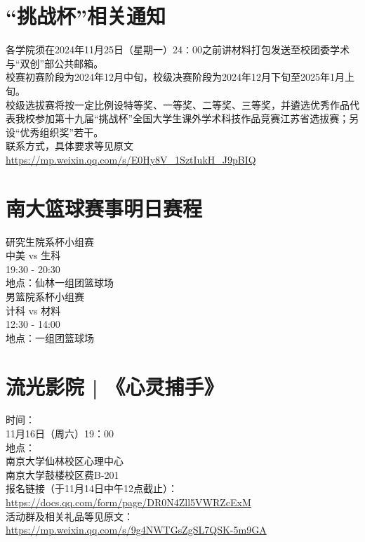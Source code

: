 \documentclass[letterpaper, 12pt]{article}
\begin{document}
\begin{multicols}{2}
\section{“挑战杯”相关通知}
各学院须在2024年11月25日（星期一）24∶00之前讲材料打包发送至校团委学术与“双创”部公共邮箱。\\
校赛初赛阶段为2024年12月中旬，校级决赛阶段为2024年12月下旬至2025年1月上旬。\\
校级选拔赛将按一定比例设特等奖、一等奖、二等奖、三等奖，并遴选优秀作品代表我校参加第十九届“挑战杯”全国大学生课外学术科技作品竞赛江苏省选拔赛；另设“优秀组织奖”若干。\\
联系方式，具体要求等见原文\url{https://mp.weixin.qq.com/s/E0Hy8V_1SztIukH_J9pBIQ}\\

\section{南大篮球赛事明日赛程}
研究生院系杯小组赛\\
中美 vs 生科\\
19:30 - 20:30\\
地点：仙林一组团篮球场\\
男篮院系杯小组赛\\
计科 vs 材料\\
12:30 - 14:00\\
地点：一组团篮球场\\

\section{流光影院 | 《心灵捕手》}
时间：\\
11月16日（周六）19：00\\
地点：\\
南京大学仙林校区心理中心\\
南京大学鼓楼校区费B-201\\
报名链接（于11月14日中午12点截止）：\url{https://docs.qq.com/form/page/DR0N4Zll5VWRZcExM}\\
活动群及相关礼品等见原文：\url{https://mp.weixin.qq.com/s/9g4NWTGsZgSL7QSK-5m9GA}


\end{multicols}
\end{document}
